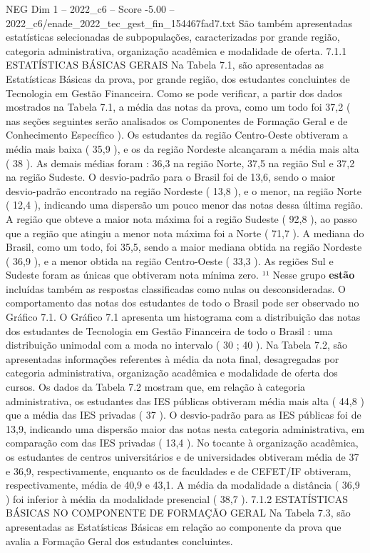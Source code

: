 \begin{textsample}{NEG Dim 1 – 2022\_c6 – Score -5.00 – 2022\_c6/enade\_2022\_tec\_gest\_fin\_154467fad7.txt}
São também apresentadas estatísticas selecionadas de subpopulações, caracterizadas por grande região, categoria administrativa, organização acadêmica e modalidade de oferta. 7.1.1 ESTATÍSTICAS BÁSICAS GERAIS Na Tabela 7.1, são apresentadas as Estatísticas Básicas da prova, por grande região, dos estudantes concluintes de Tecnologia em Gestão Financeira.
Como se pode verificar, a partir dos dados mostrados na Tabela 7.1, a média das notas da prova, como um todo foi 37,2 ( nas seções seguintes serão analisados os Componentes de Formação Geral e de Conhecimento Específico ).
Os estudantes da região Centro-Oeste obtiveram a média mais baixa ( 35,9 ), e os da região Nordeste alcançaram a média mais alta ( 38 ).
As demais médias foram : 36,3 na região Norte, 37,5 na região Sul e 37,2 na região Sudeste.
O desvio-padrão para o Brasil foi de 13,6, sendo o maior desvio-padrão encontrado na região Nordeste ( 13,8 ), e o menor, na região Norte ( 12,4 ), indicando uma dispersão um pouco menor das notas dessa última região.
A região que obteve a maior nota máxima foi a região Sudeste ( 92,8 ), ao passo que a região que atingiu a menor nota máxima foi a Norte ( 71,7 ).
A mediana do Brasil, como um todo, foi 35,5, sendo a maior mediana obtida na região Nordeste ( 36,9 ), e a menor obtida na região Centro-Oeste ( 33,3 ).
As regiões Sul e Sudeste foram as únicas que obtiveram nota mínima zero. ¹¹ Nesse grupo \textbf{estão} incluídas também as respostas classificadas como nulas ou desconsideradas.
O comportamento das notas dos estudantes de todo o Brasil pode ser observado no Gráfico 7.1.
O Gráfico 7.1 apresenta um histograma com a distribuição das notas dos estudantes de Tecnologia em Gestão Financeira de todo o Brasil : uma distribuição unimodal com a moda no intervalo ( 30 ; 40 ).
Na Tabela 7.2, são apresentadas informações referentes à média da nota final, desagregadas por categoria administrativa, organização acadêmica e modalidade de oferta dos cursos.
Os dados da Tabela 7.2 mostram que, em relação à categoria administrativa, os estudantes das IES públicas obtiveram média mais alta ( 44,8 ) que a média das IES privadas ( 37 ).
O desvio-padrão para as IES públicas foi de 13,9, indicando uma dispersão maior das notas nesta categoria administrativa, em comparação com das IES privadas ( 13,4 ).
No tocante à organização acadêmica, os estudantes de centros universitários e de universidades obtiveram média de 37 e 36,9, respectivamente, enquanto os de faculdades e de CEFET/IF obtiveram, respectivamente, média de 40,9 e 43,1.
A média da modalidade a distância ( 36,9 ) foi inferior à média da modalidade presencial ( 38,7 ). 7.1.2 ESTATÍSTICAS BÁSICAS NO COMPONENTE DE FORMAÇÃO GERAL Na Tabela 7.3, são apresentadas as Estatísticas Básicas em relação ao componente da prova que avalia a Formação Geral dos estudantes concluintes.

\end{textsample}
